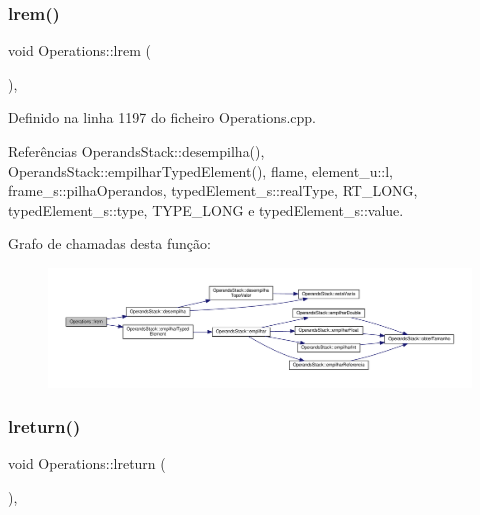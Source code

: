 \subsubsection{\texorpdfstring{lrem()}{lrem()}}
{\footnotesize\ttfamily void Operations\+::lrem (\begin{DoxyParamCaption}{ }\end{DoxyParamCaption})\hspace{0.3cm}{\ttfamily [static]}, {\ttfamily [private]}}



Definido na linha 1197 do ficheiro Operations.\+cpp.



Referências Operands\+Stack\+::desempilha(), Operands\+Stack\+::empilhar\+Typed\+Element(), flame, element\+\_\+u\+::l, frame\+\_\+s\+::pilha\+Operandos, typed\+Element\+\_\+s\+::real\+Type, R\+T\+\_\+\+L\+O\+NG, typed\+Element\+\_\+s\+::type, T\+Y\+P\+E\+\_\+\+L\+O\+NG e typed\+Element\+\_\+s\+::value.

Grafo de chamadas desta função\+:
\nopagebreak
\begin{figure}[H]
\begin{center}
\leavevmode
\includegraphics[width=350pt]{classOperations_a437e4b34f2f1be8982d36f0cdf47f98c_cgraph}
\end{center}
\end{figure}
\mbox{\label{classOperations_adbc4db2dbfcae7185bc9b7a005e988ea}} 
\subsubsection{\texorpdfstring{lreturn()}{lreturn()}}
{\footnotesize\ttfamily void Operations\+::lreturn (\begin{DoxyParamCaption}{ }\end{DoxyParamCaption})\hspace{0.3cm}{\ttfamily [static]}, {\ttfamily [private]}}



